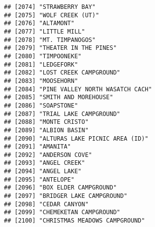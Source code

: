\documentclass[
]{article}
\begin{document}
\begin{verbatim}
## [2074] "STRAWBERRY BAY"                                                                      
## [2075] "WOLF CREEK (UT)"                                                                     
## [2076] "ALTAMONT"                                                                            
## [2077] "LITTLE MILL"                                                                         
## [2078] "MT. TIMPANOGOS"                                                                      
## [2079] "THEATER IN THE PINES"                                                                
## [2080] "TIMPOONEKE"                                                                          
## [2081] "LEDGEFORK"                                                                           
## [2082] "LOST CREEK CAMPGROUND"                                                               
## [2083] "MOOSEHORN"                                                                           
## [2084] "PINE VALLEY NORTH WASATCH CACH"                                                      
## [2085] "SMITH AND MOREHOUSE"                                                                 
## [2086] "SOAPSTONE"                                                                           
## [2087] "TRIAL LAKE CAMPGROUND"                                                               
## [2088] "MONTE CRISTO"                                                                        
## [2089] "ALBION BASIN"                                                                        
## [2090] "ALTURAS LAKE PICNIC AREA (ID)"                                                       
## [2091] "AMANITA"                                                                             
## [2092] "ANDERSON COVE"                                                                       
## [2093] "ANGEL CREEK"                                                                         
## [2094] "ANGEL LAKE"                                                                          
## [2095] "ANTELOPE"                                                                            
## [2096] "BOX ELDER CAMPGROUND"                                                                
## [2097] "BRIDGER LAKE CAMPGROUND"                                                             
## [2098] "CEDAR CANYON"                                                                        
## [2099] "CHEMEKETAN CAMPGROUND"                                                               
## [2100] "CHRISTMAS MEADOWS CAMPGROUND"                                                        

\end{verbatim}
\end{document}
